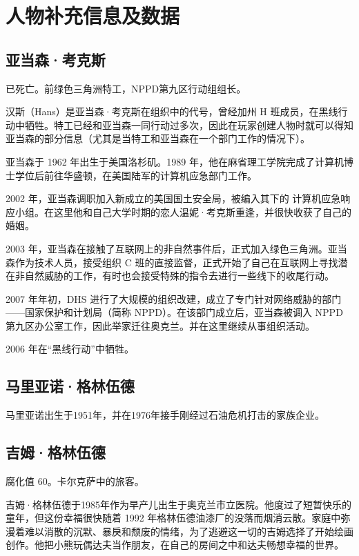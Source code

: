 \chapter{人物补充信息及数据}

\section{亚当森·考克斯}

已死亡。前绿色三角洲特工，NPPD第九区行动组组长。

汉斯（Hans）是亚当森·考克斯在组织中的代号，曾经加州 H 班成员，在黑线行动中牺牲。特工已经和亚当森一同行动过多次，因此在玩家创建人物时就可以得知亚当森的部分信息（尤其是当特工和亚当森在一个部门工作的情况下）。

亚当森于 1962 年出生于美国洛杉矶。1989 年，他在麻省理工学院完成了计算机博士学位后前往华盛顿，在美国陆军的计算机应急部门工作。

2002 年，亚当森调职加入新成立的美国国土安全局，被编入其下的 计算机应急响应小组。在这里他和自己大学时期的恋人温妮·考克斯重逢，并很快收获了自己的婚姻。

2003 年，亚当森在接触了互联网上的非自然事件后，正式加入绿色三角洲。亚当森作为技术人员，接受组织 C 班的直接监督，正式开始了自己在互联网上寻找潜在非自然威胁的工作，有时也会接受特殊的指令去进行一些线下的收尾行动。

2007 年年初，DHS 进行了大规模的组织改建，成立了专门针对网络威胁的部门——国家保护和计划局（简称 NPPD）。在该部门成立后，亚当森被调入 NPPD 第九区办公室工作，因此举家迁往奥克兰。并在这里继续从事组织活动。

2006 年在“黑线行动”中牺牲。

\section{马里亚诺·格林伍德}

马里亚诺出生于1951年，并在1976年接手刚经过石油危机打击的家族企业。

\section{吉姆·格林伍德}

腐化值 60。卡尔克萨中的旅客。

吉姆·格林伍德于1985年作为早产儿出生于奥克兰市立医院。他度过了短暂快乐的童年，但这份幸福很快随着 1992 年格林伍德油漆厂的没落而烟消云散。家庭中弥漫着难以消散的沉默、暴戾和颓废的情绪，为了逃避这一切的吉姆选择了开始绘画创作。他把小熊玩偶达夫当作朋友，在自己的房间之中和达夫畅想幸福的世界。

